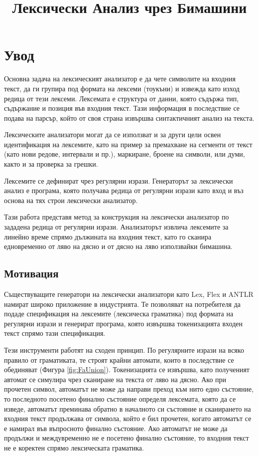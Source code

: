 \documentclass[12pt, oneside]{article}
\title{Лексически Анализ чрез Бимашини}
\theoremstyle{definition}
\begin{document}
\tableofcontents

\pagebreak
\section{Увод}

Основна задача на лексическият анализатор е да чете символите на входния текст, да ги групира под формата на лексеми (тоукъни) и извежда като изход редица от тези лексеми. Лексемата е структура от данни, която съдържа тип, съдържание и позиция във входния текст. Тази информация в последствие се подава на парсър, който от своя страна извършва синтактичният анализ на текста.

Лексическите анализатори могат да се използват и за други цели освен идентификация на лексемите, като на пример за премахване на сегменти от текст (като нови редове, интервали и пр.), маркиране, броене на символи, или думи, както и за проверка за грешки.

Лексемите се дефинират чрез регулярни изрази. Генераторът за лексически анализ е програма, която получава редица от регулярни изрази като вход и въз основа на тях строи лексически анализатор.

Тази работа представя метод за конструкция на лексически анализатор по зададена редица от регулярни изрази. Анализаторът извлича лексемите за линейно време спрямо дължината на входния текст, като го сканира едновременно от ляво на дясно и от дясно на ляво използвайки бимашина.


\subsection{Мотивация}

Съществуващите генератори на лексически анализатори като Lex, Flex и ANTLR намират широко приложение в индустрията. Те позволяват на потребителя да подаде спецификация на лексемите (лексическа граматика) под формата на регулярни изрази и генерират програма, която извършва токенизацията входен текст спрямо тази спецификация.

Тези инструменти работят на сходен принцип. По регулярните изрази на всяко правило от граматиката, те строят крайни автомати, които в последствие се обединяват (Фигура \ref{fig:FaUnion}). Токенизацията се извършва, като полученият автомат се симулира чрез сканиране на текста от ляво на дясно. 
Ако при прочетен символ, автоматът не може да направи преход към нито едно състояние, то последното посетено финално състояние определя лексемата, която да се изведе, автоматът преминава обратно в началното си състояние и сканирането на входния текст продължава от символа, който е бил прочетен, когато автоматът се е намирал във въпросното финално състояние. Ако автоматът не може да продължи и междувременно не е посетено финално състояние, то входния текст не е коректен спрямо лексическата граматика.
\end{document}

